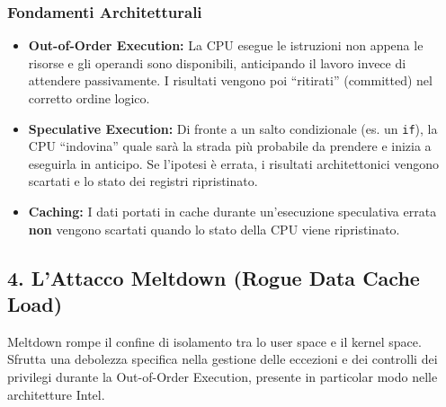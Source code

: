 \documentclass{article}
\begin{document}
\subsubsection{Fondamenti Architetturali}
\begin{itemize}
    \item \textbf{Out-of-Order Execution:} La CPU esegue le istruzioni non appena le risorse e gli operandi sono disponibili, anticipando il lavoro invece di attendere passivamente. I risultati vengono poi ``ritirati'' (committed) nel corretto ordine logico.
    \item \textbf{Speculative Execution:} Di fronte a un salto condizionale (es. un \texttt{if}), la CPU ``indovina'' quale sarà la strada più probabile da prendere e inizia a eseguirla in anticipo. Se l'ipotesi è errata, i risultati architettonici vengono scartati e lo stato dei registri ripristinato.
    \item \textbf{Caching:} I dati portati in cache durante un'esecuzione speculativa errata \textbf{non} vengono scartati quando lo stato della CPU viene ripristinato.
\end{itemize}

\subsection{4. L'Attacco Meltdown (Rogue Data Cache Load)}
Meltdown rompe il confine di isolamento tra lo user space e il kernel space. Sfrutta una debolezza specifica nella gestione delle eccezioni e dei controlli dei privilegi durante la Out-of-Order Execution, presente in particolar modo nelle architetture Intel.
\end{document}
